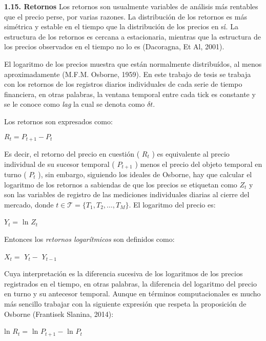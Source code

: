 {
\noindent
\Large  \textbf{1.15. Retornos} 
}
\newline
Los retornos son usualmente variables de análisis más rentables que el precio perse, por varias razones. La distribución de los retornos es más simétrica y estable en el tiempo que la distribución de los precios en sí. La estructura de los retornos es cercana a estacionaria, mientras que la estructura de los precios observados en el tiempo no lo es (Dacoragna, Et Al, 2001).
\newpage

El logaritmo de los precios muestra que están normalmente distribuídos, al menos aproximadamente (M.F.M. Osborne, 1959). En este trabajo de tesis se trabaja con los retornos de los registros diarios individuales de cada serie de tiempo financiera, en otras palabras, la ventana temporal entre cada \guillemotleft tick \guillemotright es constante y se le conoce como \textit{lag} la cual se denota como $\delta t$. 
\newline

Los retornos son expresados como:
\begin{center}
$R_t=P_{t+1}-P_t$
\end{center}
Es decir, el retorno del precio en cuestión ( $R_t$ ) es equivalente al precio individual de su sucesor temporal ( $P_{t+1}$ ) menos el precio del objeto temporal en turno ( $P_t$ ), sin embargo, siguiendo los ideales de Osborne, hay que calcular el logaritmo de los retornos a sabiendas de que los precios se etiquetan como $\mathit{Z_t}$ y son las variables de registro de las mediciones individuales diarias al cierre del mercado, donde \newline $t \in \mathcal{T} = \{\mathit{T_1,T_2,\ldots , T_M}\}$. El logaritmo del precio es:

\begin{center}
$\mathit{Y_{t}} = $ ln $\mathit{Z_{t}}$
\end{center}

Entonces los \textit{retornos logarítmicos} son definidos como: 

\begin{center}
$X_t = $ $\mathit{Y_{t}} - $  $\mathit{Y_{t - 1}}$
\end{center}

Cuya interpretación es la diferencia sucesiva de los logaritmos de los precios  registrados en el tiempo, en otras palabras, la diferencia del logaritmo del precio en turno y su antecesor temporal. Aunque en términos computacionales es mucho más sencillo trabajar con la siguiente expresión que respeta la proposición de Osborne (Frantisek Slanina, 2014): 
\begin{center}
ln $R_t = $ ln $\mathit{P_{t+1}} - $ ln $\mathit{P_{t}}$
\end{center}%

